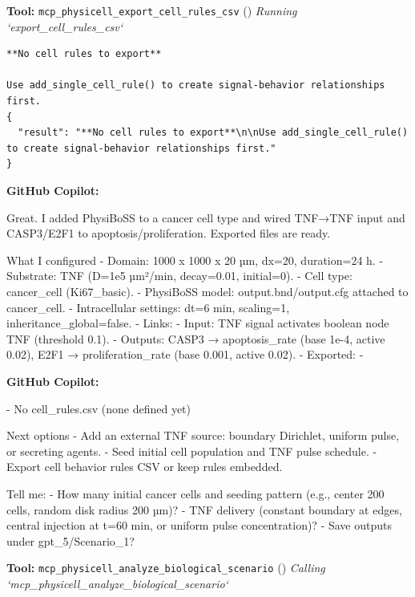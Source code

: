\documentclass[11pt,a4paper]{article}
\begin{document}
\begin{toolokbox}
\textbf{Tool:} \texttt{mcp\_physicell\_export\_cell\_rules\_csv} (\checkmark)
\textit{Running `export\_cell\_rules\_csv`}
\begin{lstlisting}
**No cell rules to export**

Use add_single_cell_rule() to create signal-behavior relationships first.
{
  "result": "**No cell rules to export**\n\nUse add_single_cell_rule() to create signal-behavior relationships first."
}
\end{lstlisting}
\end{toolokbox}
\begin{copilotbox}
\textbf{GitHub Copilot:}

Great. I added PhysiBoSS to a cancer cell type and wired TNF→TNF input and CASP3/E2F1 to apoptosis/proliferation. Exported files are ready.

What I configured
- Domain: 1000 x 1000 x 20 µm, dx=20, duration=24 h.
- Substrate: TNF (D=1e5 µm²/min, decay=0.01, initial=0).
- Cell type: cancer\_cell (Ki67\_basic).
- PhysiBoSS model: output.bnd/output.cfg attached to cancer\_cell.
- Intracellular settings: dt=6 min, scaling=1, inheritance\_global=false.
- Links:
  - Input: TNF signal activates boolean node TNF (threshold 0.1).
  - Outputs: CASP3 → apoptosis\_rate (base 1e-4, active 0.02), E2F1 → proliferation\_rate (base 0.001, active 0.02).
- Exported:
  -

\end{copilotbox}
\begin{copilotbox}
\textbf{GitHub Copilot:}

- No cell\_rules.csv (none defined yet)

Next options
- Add an external TNF source: boundary Dirichlet, uniform pulse, or secreting agents.
- Seed initial cell population and TNF pulse schedule.
- Export cell behavior rules CSV or keep rules embedded.

Tell me:
- How many initial cancer cells and seeding pattern (e.g., center 200 cells, random disk radius 200 µm)?
- TNF delivery (constant boundary at edges, central injection at t=60 min, or uniform pulse concentration)?
- Save outputs under gpt\_5/Scenario\_1?

\end{copilotbox}
\begin{toolokbox}
\textbf{Tool:} \texttt{mcp\_physicell\_analyze\_biological\_scenario} (\checkmark)
\textit{Calling `mcp\_physicell\_analyze\_biological\_scenario`}
\end{toolokbox}
\end{document}
